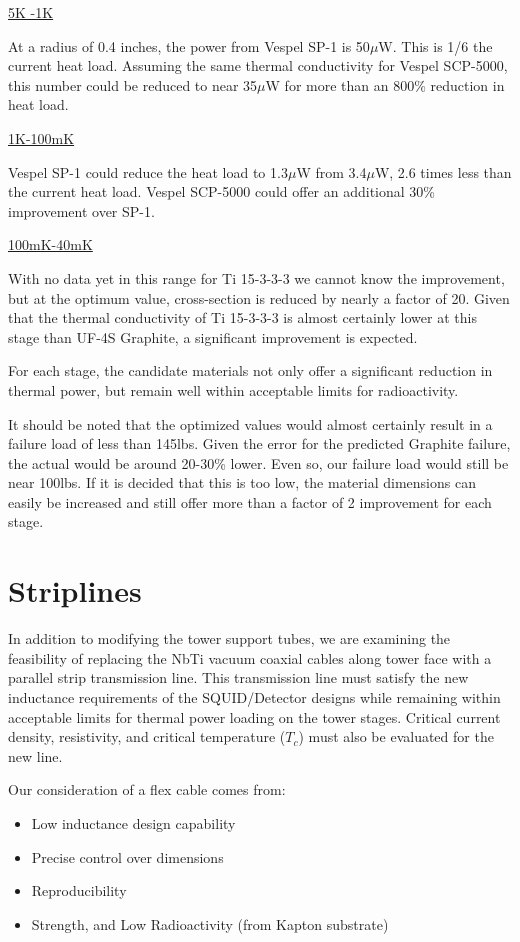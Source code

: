 \documentclass{report}
\begin{document}
\large{\underline{5K -1K}}

At a radius of 0.4 inches, the power from Vespel SP-1 is 50$\mu$W. This is 1/6 the current heat load. Assuming the same thermal conductivity for Vespel SCP-5000, this number could
be reduced to near 35$\mu$W for more than an 800\% reduction in heat load.

\smallskip

\underline{{\large 1K-100mK}}

Vespel SP-1 could reduce the heat load to 1.3$\mu$W from 3.4$\mu$W, 2.6 times less than the current heat load. Vespel SCP-5000 could offer an additional 30\% improvement over SP-1.

\smallskip

\underline{{\large 100mK-40mK}}

With no data yet in this range for Ti 15-3-3-3 we cannot know the improvement, but at the optimum value, cross-section is reduced by nearly a factor of 20. Given that the thermal
conductivity of Ti 15-3-3-3 is almost certainly lower at this stage than UF-4S Graphite, a significant improvement is expected.

\bigskip

For each stage, the candidate materials not only offer a significant reduction in thermal power, but remain well within acceptable limits for radioactivity.

It should be noted that the optimized values would almost certainly result in a failure load of less than 145lbs. Given the error for the predicted Graphite failure, the actual
would be around 20-30\% lower. Even so, our failure load would still be near 100lbs. If it is decided that this is too low, the material dimensions can easily be increased and
still offer more than a factor of 2 improvement for each stage.

\section{Striplines}
In addition to modifying the tower support tubes, we are examining the feasibility of replacing the NbTi vacuum coaxial cables along tower face with a parallel strip transmission
line. This transmission line must satisfy the new inductance requirements of the SQUID/Detector designs while remaining within acceptable limits for thermal power loading on the
tower stages. Critical current density, resistivity, and critical temperature ($T_{c}$) must also be evaluated for the new line.

Our consideration of a flex cable comes from:
\begin{itemize}
\item Low inductance design capability
\item Precise control over dimensions
\item Reproducibility
\item Strength, and Low Radioactivity (from Kapton substrate)
\end{itemize}
\end{document}
